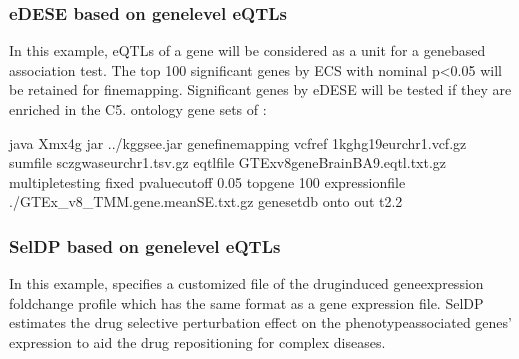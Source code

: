 \documentclass[letterpaper,10pt,english,openany,oneside]{sphinxmanual}
\begin{document}
\subsubsection{eDESE based on gene\sphinxhyphen{}level eQTLs}
\label{\detokenize{detailed_document:edese-based-on-gene-level-eqtls}}
\sphinxAtStartPar
In this example, eQTLs of a gene will be considered as a unit for a gene\sphinxhyphen{}based association test. The top 100 significant genes by ECS with nominal p\textless{}0.05 will be retained for fine\sphinxhyphen{}mapping. Significant genes by eDESE will be tested if they are enriched in the C5. ontology gene sets of :

\begin{sphinxVerbatim}[commandchars=\\\{\}]
java \PYGZhy{}Xmx4g \PYGZhy{}jar ../kggsee.jar 
  \PYGZhy{}\PYGZhy{}gene\PYGZhy{}finemapping 
  \PYGZhy{}\PYGZhy{}vcf\PYGZhy{}ref 1kg\PYGZus{}hg19\PYGZus{}eur\PYGZus{}chr1.vcf.gz 
  \PYGZhy{}\PYGZhy{}sum\PYGZhy{}file scz\PYGZus{}gwas\PYGZus{}eur\PYGZus{}chr1.tsv.gz 
  \PYGZhy{}\PYGZhy{}eqtl\PYGZhy{}file GTEx\PYGZus{}v8\PYGZus{}gene\PYGZus{}BrainBA9.eqtl.txt.gz 
  \PYGZhy{}\PYGZhy{}multiple\PYGZhy{}testing fixed 
  \PYGZhy{}\PYGZhy{}p\PYGZhy{}value\PYGZhy{}cutoff 0.05 
  \PYGZhy{}\PYGZhy{}top\PYGZhy{}gene 100 
  \PYGZhy{}\PYGZhy{}expression\PYGZhy{}file ./GTEx_v8_TMM.gene.meanSE.txt.gz 
  \PYGZhy{}\PYGZhy{}geneset\PYGZhy{}db onto 
  \PYGZhy{}\PYGZhy{}out t2.2
\end{sphinxVerbatim}


\subsubsection{SelDP based on gene\sphinxhyphen{}level eQTLs}
\label{\detokenize{detailed_document:seldp-based-on-gene-level-eqtls}}
\sphinxAtStartPar
In this example,  specifies a customized file of the drug\sphinxhyphen{}induced gene\sphinxhyphen{}expression fold\sphinxhyphen{}change profile which has the same format as a gene expression file. SelDP estimates the drug selective perturbation effect on the phenotype\sphinxhyphen{}associated genes’ expression to aid the drug repositioning for complex diseases.
\end{document}
